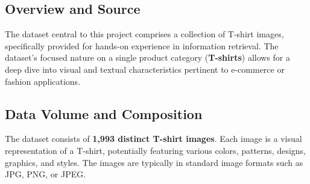\documentclass{article}
\begin{document}
\subsection{Overview and Source}
The dataset central to this project comprises a collection of T-shirt images, specifically provided for hands-on experience in information retrieval. The dataset's focused nature on a single product category (\textbf{T-shirts}) allows for a deep dive into visual and textual characteristics pertinent to e-commerce or fashion applications.

\subsection{Data Volume and Composition}
The dataset consists of \textbf{1,993 distinct T-shirt images}. Each image is a visual representation of a T-shirt, potentially featuring various colors, patterns, designs, graphics, and styles. The images are typically in standard image formats such as JPG, PNG, or JPEG.
\end{document}
